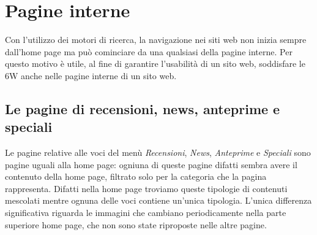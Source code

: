 \documentclass[../ProgettoTecWeb2.tex]{subfiles}
\begin{document}
\section{Pagine interne}
	Con l'utilizzo dei motori di ricerca, la navigazione nei siti web non inizia sempre dall'home page ma può cominciare da una qualsiasi della pagine interne. Per questo motivo è utile, al fine di garantire l'usabilità di un sito web, soddisfare le 6W anche nelle pagine interne di un sito web.

	\subsection{Le pagine di recensioni, news, anteprime e speciali}
	Le pagine relative alle voci del menù \textit{Recensioni}, \textit{News}, \textit{Anteprime} e \textit{Speciali} sono pagine uguali alla home page: ogniuna di queste pagine difatti sembra avere il contenuto della home page, filtrato solo per la categoria che la pagina rappresenta. Difatti nella home page troviamo queste tipologie di contenuti mescolati mentre ognuna delle voci contiene un'unica tipologia.
	L'unica differenza significativa riguarda le immagini che cambiano periodicamente nella parte superiore home page, che non sono state riproposte nelle altre pagine.
\end{document}
